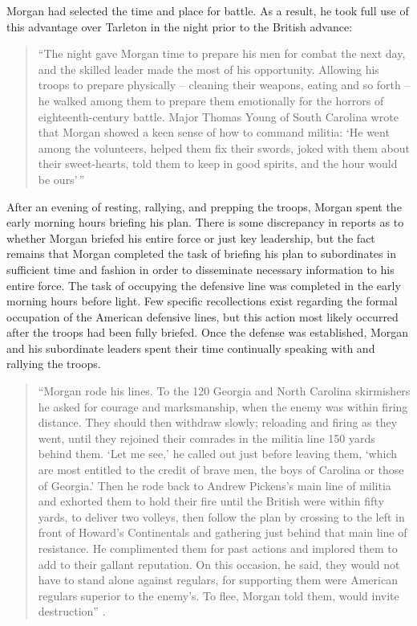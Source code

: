 Morgan had selected the time and place for battle.  As a result, he took full
use of this advantage over Tarleton in the night prior to the British advance:

\begin{quote}
  ``The night gave Morgan time to prepare his men for combat the next day, and
  the skilled leader made the most of his opportunity. Allowing his troops to
  prepare physically -- cleaning their weapons, eating and so forth -- he walked
  among them to prepare them emotionally for the horrors of eighteenth-century
  battle. Major Thomas Young of South Carolina wrote that Morgan showed a keen
  sense of how to command militia: `He went among the volunteers, helped them
  fix their swords, joked with them about their sweet-hearts, told them to keep
  in good spirits, and the hour would be ours'\,'' \cite[47]{moncure_cowpens_1996}
\end{quote}

After an evening of resting, rallying, and prepping the troops, Morgan spent the
early morning hours briefing his plan.  There is some discrepancy in reports as
to whether Morgan briefed his entire force or just key leadership, but the fact
remains that Morgan completed the task of briefing his plan to subordinates in
sufficient time and fashion in order to disseminate necessary information to his
entire force.   The task of occupying the defensive line was completed in the
early morning hours before light.  Few specific recollections exist regarding
the formal occupation of the American defensive lines, but this action most
likely occurred after the troops had been fully briefed.   Once the defense was
established, Morgan and his subordinate leaders spent their time continually
speaking with and rallying the troops. 

\begin{quote}
“Morgan rode his lines.  To the 120 Georgia and North Carolina skirmishers he
asked for courage and marksmanship, when the enemy was within firing distance.
They should then withdraw slowly; reloading and firing as they went, until they
rejoined their comrades in the militia line 150 yards behind them. ‘Let me see,’
he called out just before leaving them, ‘which are most entitled to the credit
of brave men, the boys of Carolina or those of Georgia.’ Then he rode back to
Andrew Pickens’s main line of militia and exhorted them to hold their fire until
the British were within fifty yards, to deliver two volleys, then follow the
plan by crossing to the left in front of Howard’s Continentals and gathering
just behind that main line of resistance.  He complimented them for past actions
and implored them to add to their gallant reputation.  On this occasion, he
said, they would not have to stand alone against regulars, for supporting them
were American regulars superior to the enemy’s.  To flee, Morgan told them,
would invite destruction” \cite[p.320]{buchanan_road_1997}.
\end{quote}

